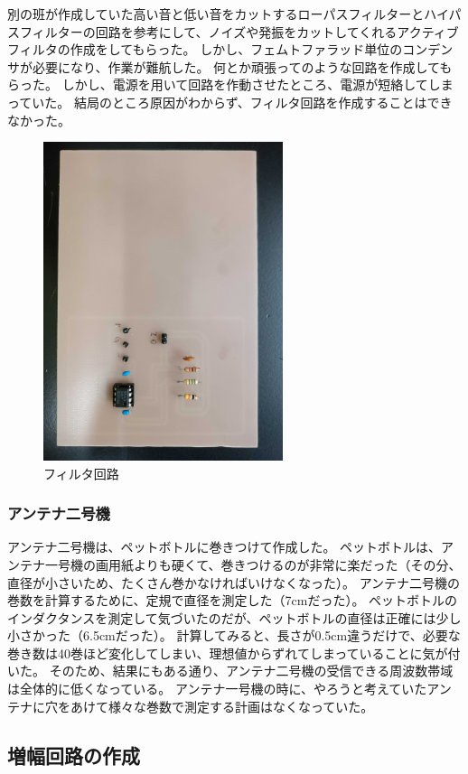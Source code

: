 \documentclass[report.tex]{subfiles}
\begin{document}
別の班が作成していた高い音と低い音をカットするローパスフィルターとハイパスフィルターの回路を参考にして、ノイズや発振をカットしてくれるアクティブフィルタの作成をしてもらった。
しかし、フェムトファラッド単位のコンデンサが必要になり、作業が難航した。
何とか頑張ってのような回路を作成してもらった。
しかし、電源を用いて回路を作動させたところ、電源が短絡してしまっていた。
結局のところ原因がわからず、フィルタ回路を作成することはできなかった。

\begin{figure}[H]
	\centering
	\includegraphics[width=7cm]{use/1.jpg}
	\caption{フィルタ回路}
	\label{fig:filter}
\end{figure}

\subsubsection{アンテナ二号機}

アンテナ二号機は、ペットボトルに巻きつけて作成した。
ペットボトルは、アンテナ一号機の画用紙よりも硬くて、巻きつけるのが非常に楽だった（その分、直径が小さいため、たくさん巻かなければいけなくなった）。
アンテナ二号機の巻数を計算するために、定規で直径を測定した（7cmだった）。
ペットボトルのインダクタンスを測定して気づいたのだが、ペットボトルの直径は正確には少し小さかった（6.5cmだった）。
計算してみると、長さが0.5cm違うだけで、必要な巻き数は40巻ほど変化してしまい、理想値からずれてしまっていることに気が付いた。
そのため、結果にもある通り、アンテナ二号機の受信できる周波数帯域は全体的に低くなっている。
アンテナ一号機の時に、やろうと考えていたアンテナに穴をあけて様々な巻数で測定する計画はなくなっていた。

\subsection{増幅回路の作成}
\end{document}
